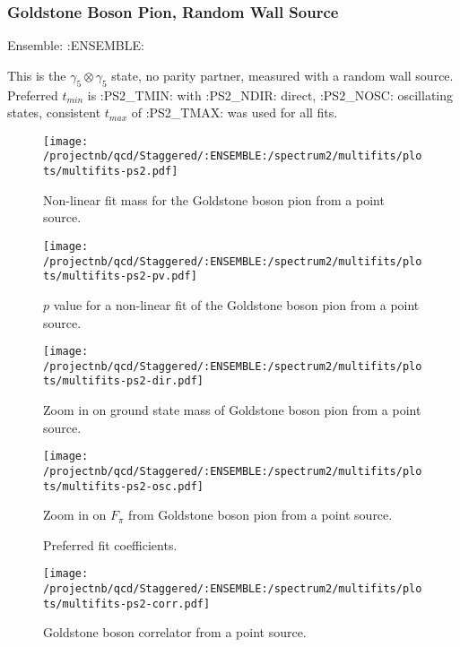 \clearpage

\subsubsection{Goldstone Boson Pion, Random Wall Source}

Ensemble: :ENSEMBLE:

This is the $\gamma_5 \otimes \gamma_5$ state, no parity partner, measured with a random wall source. Preferred $t_{min}$ is :PS2_TMIN: with :PS2_NDIR: direct, :PS2_NOSC: oscillating states, consistent $t_{max}$ of :PS2_TMAX: was used for all fits.

\begin{multicols}{2}
\begin{figure}[H]
\centering
\texttt{[image: /projectnb/qcd/Staggered/:ENSEMBLE:/spectrum2/multifits/plots/multifits-ps2.pdf]}
\caption{Non-linear fit mass for the Goldstone boson pion from a point source.}
\end{figure}
\columnbreak
\begin{figure}[H]
\centering
\texttt{[image: /projectnb/qcd/Staggered/:ENSEMBLE:/spectrum2/multifits/plots/multifits-ps2-pv.pdf]}
\caption{$p$ value for a non-linear fit of the Goldstone boson pion from a point source.}
\end{figure}
\end{multicols}

\begin{multicols}{2}
\begin{figure}[H]
\centering
\texttt{[image: /projectnb/qcd/Staggered/:ENSEMBLE:/spectrum2/multifits/plots/multifits-ps2-dir.pdf]}
\caption{Zoom in on ground state mass of Goldstone boson pion from a point source.}
\end{figure}
\columnbreak
\begin{figure}[H]
\centering
\texttt{[image: /projectnb/qcd/Staggered/:ENSEMBLE:/spectrum2/multifits/plots/multifits-ps2-osc.pdf]}
\caption{Zoom in on $F_\pi$ from Goldstone boson pion from a point source.}
\end{figure}
\end{multicols}

\begin{multicols}{2}
\begin{figure}[H]
\centering
\scriptsize

\caption{Preferred fit coefficients.}
\end{figure}
\columnbreak
\begin{figure}[H]
\centering
\texttt{[image: /projectnb/qcd/Staggered/:ENSEMBLE:/spectrum2/multifits/plots/multifits-ps2-corr.pdf]}
\caption{Goldstone boson correlator from a point source.}
\end{figure}
\end{multicols}

